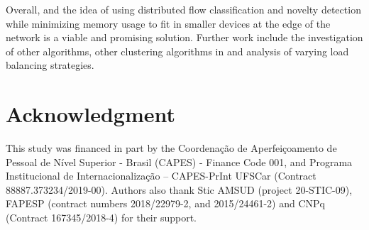 Overall, \mfog and the idea of using distributed flow classification and novelty
detection while minimizing memory usage to fit in smaller devices at the edge of
the network is a viable and promising solution.
Further work include the investigation of other \nd algorithms, other clustering
algorithms in \minas and analysis of varying load balancing strategies.



\section*{Acknowledgment}

This study was financed in part by the Coordenação de Aperfeiçoamento de Pessoal de
Nível Superior - Brasil (CAPES) - Finance Code 001,
and Programa Institucional de Internacionalização – CAPES-PrInt UFSCar (Contract 88887.373234/2019-00). 
Authors also thank Stic AMSUD (project 20-STIC-09), FAPESP (contract numbers  2018/22979-2, and 2015/24461-2) and CNPq (Contract 167345/2018-4) for their support.
